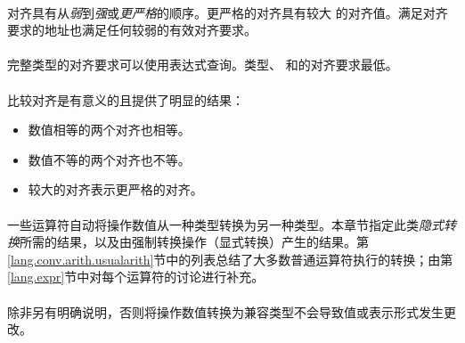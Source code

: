 \paragraph{}
对齐具有从\textit{弱}到\textit{强}或\textit{更严格}的顺序。更严格的对齐具有较大
的对齐值。满足对齐要求的地址也满足任何较弱的有效对齐要求。

\paragraph{}
完整类型的对齐要求可以使用表达式查询。类型、
和的对齐要求最低。

\paragraph{}
比较对齐是有意义的且提供了明显的结果：
\begin{itemize}
  \item{数值相等的两个对齐也相等。}
  \item{数值不等的两个对齐也不等。}
  \item{较大的对齐表示更严格的对齐。}
\end{itemize}

\paragraph{}
一些运算符自动将操作数值从一种类型转换为另一种类型。本章节指定此类\textit{隐式转
换}所需的结果，以及由强制转换操作（显式转换）产生的结果。第
\ref{lang.conv.arith.usualarith}节中的列表总结了大多数普通运算符执行的转换；由第
\ref{lang.expr}节中对每个运算符的讨论进行补充。

\paragraph{}
除非另有明确说明，否则将操作数值转换为兼容类型不会导致值或表示形式发生更改。


